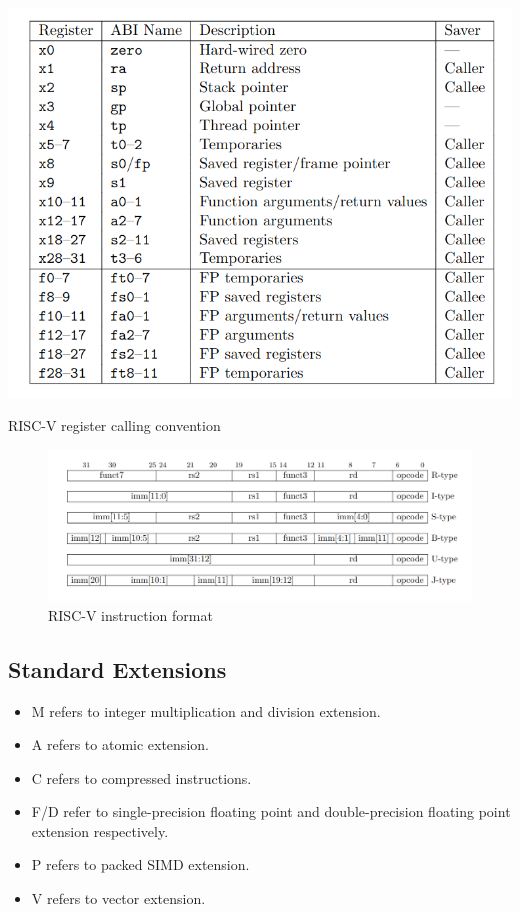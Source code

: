 \begin{table}[ht]
    \centering
    \includegraphics[width=.85\linewidth]{figures/RISCV_register_calling_convention.png}
    \caption{RISC-V register calling convention}
    \label{table:riscv_register_calling_convention}
\end{table}

\begin{figure}
    \centering
    \includegraphics[width=1\linewidth]{figures/RISCV_basic_instruction_format.png}
    \caption{RISC-V instruction format}
    \label{fig:riscv_base_instruction_format}
\end{figure}

\subsection{Standard Extensions}
\begin{itemize}
    \item M refers to integer multiplication and division extension.
    
    \item A refers to atomic extension.
    
    \item C refers to compressed instructions. 
    
    \item F/D refer to single-precision floating point and double-precision floating point extension respectively.
    
    \item P refers to packed SIMD extension.
    
    \item V refers to vector extension.
\end{itemize}

